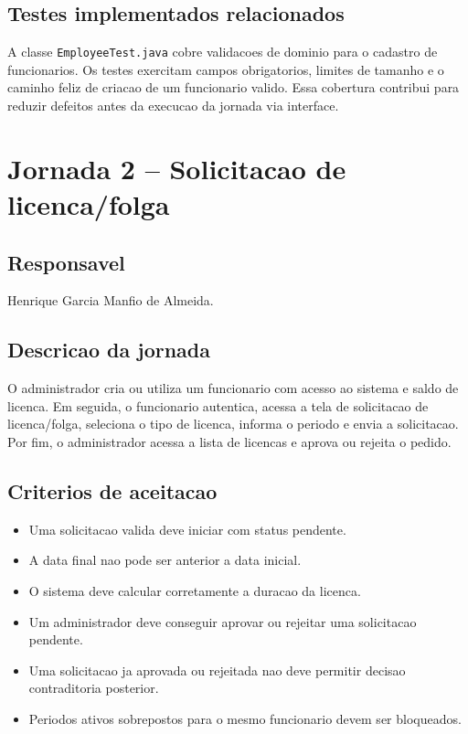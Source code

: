 \documentclass[12pt,a4paper]{article}
\providecommand{\PessoaDois}{Henrique Garcia Manfio de Almeida}
\newcommand{\ClasseTeste}[1]{\texttt{#1}}
\begin{document}
\subsection{Testes implementados relacionados}

A classe \ClasseTeste{EmployeeTest.java} cobre validacoes de dominio para o cadastro de funcionarios. Os testes exercitam campos obrigatorios, limites de tamanho e o caminho feliz de criacao de um funcionario valido. Essa cobertura contribui para reduzir defeitos antes da execucao da jornada via interface.

\newpage
\section{Jornada 2 -- Solicitacao de licenca/folga}

\subsection{Responsavel}

\PessoaDois.

\subsection{Descricao da jornada}

O administrador cria ou utiliza um funcionario com acesso ao sistema e saldo de licenca. Em seguida, o funcionario autentica, acessa a tela de solicitacao de licenca/folga, seleciona o tipo de licenca, informa o periodo e envia a solicitacao. Por fim, o administrador acessa a lista de licencas e aprova ou rejeita o pedido.

\subsection{Criterios de aceitacao}

\begin{itemize}
    \item Uma solicitacao valida deve iniciar com status pendente.
    \item A data final nao pode ser anterior a data inicial.
    \item O sistema deve calcular corretamente a duracao da licenca.
    \item Um administrador deve conseguir aprovar ou rejeitar uma solicitacao pendente.
    \item Uma solicitacao ja aprovada ou rejeitada nao deve permitir decisao contraditoria posterior.
    \item Periodos ativos sobrepostos para o mesmo funcionario devem ser bloqueados.
\end{itemize}
\end{document}
